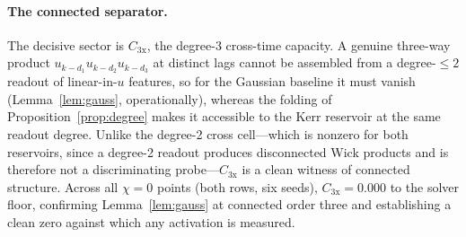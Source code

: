 \documentclass[11pt]{article}
\theoremstyle{remark}
\begin{document}
\paragraph{The connected separator.} The decisive sector is $C_{3\mathrm{x}}$, the
degree-3 cross-time capacity. A genuine three-way product
$u_{k-d_1}u_{k-d_2}u_{k-d_3}$ at distinct lags cannot be assembled from a degree-$\le2$
readout of linear-in-$u$ features, so for the Gaussian baseline it must vanish
(Lemma~\ref{lem:gauss}, operationally), whereas the folding of
Proposition~\ref{prop:degree} makes it accessible to the Kerr reservoir at the same
readout degree. Unlike the degree-2 cross cell---which is nonzero for both reservoirs,
since a degree-2 readout produces disconnected Wick products and is therefore not a
discriminating probe---$C_{3\mathrm{x}}$ is a clean witness of connected structure.
Across all $\chi=0$ points (both rows, six seeds), $C_{3\mathrm{x}}=0.000$ to the
solver floor, confirming Lemma~\ref{lem:gauss} at connected order three and
establishing a clean zero against which any activation is measured.
\end{document}
